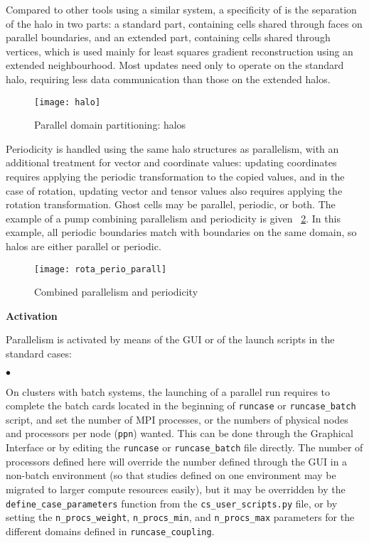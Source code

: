 {{{Compared to other tools using a similar system, a specificity of
\CS is the separation of the halo in two parts: a standard part,
containing cells shared through faces on parallel boundaries, and an
extended part, containing cells shared through vertices, which is
used mainly for least squares gradient reconstruction using an
extended neighbourhood. Most updates need only to operate on the standard
halo, requiring less data communication than those on the extended halos.

\begin{figure}[!h]
\centerline{
\texttt{[image: halo]}}
\caption{Parallel domain partitioning: halos}\label{fig:haluile}
\end{figure}

Periodicity is handled using the same halo structures as parallelism,
with an additional treatment for vector and coordinate values: updating
coordinates requires applying the periodic transformation to the copied
values, and in the case of rotation, updating vector and tensor values
also requires applying the rotation transformation.
Ghost cells may be parallel, periodic, or both. The example of a pump
combining parallelism and periodicity is given \figurename~\ref{fig:parperio_pump}.
In this example, all periodic boundaries match with boundaries on
the same domain, so halos are either parallel or periodic.

\begin{figure}[!h]
\centerline{
\texttt{[image: rota\_perio\_parall]}}
\caption{Combined parallelism and periodicity}\label{fig:parperio_pump}
\end{figure}

\label{prg_paralperio}
{\bf Activation}

Parallelism is activated by means of the GUI or of the launch scripts
in the standard cases:
\begin{list}{$\bullet$}{}

\item On clusters with batch systems, the launching of a parallel run
      requires to complete the batch cards located in the
      beginning of \texttt{runcase} or \texttt{runcase\_batch}
      script, and set the number of MPI processes, or the numbers
      of physical nodes and processors per node (\texttt{ppn}) wanted.
      This can be done through the Graphical Interface or by editing
      the \texttt{runcase}  or \texttt{runcase\_batch} file directly.
      The number of processors defined here will override the number
      defined through the GUI in a non-batch environment
      (so that studies defined on one environment may be migrated
      to larger compute resources easily), but it may be overridden
      by the \texttt{define\_case\_parameters} function from
      the \texttt{cs\_user\_scripts.py} file, or by setting the
      \texttt{n\_procs\_weight}, \texttt{n\_procs\_min}, and
      \texttt{n\_procs\_max} parameters for the different domains
      defined in \texttt{runcase\_coupling}.


\end{list}}}}
